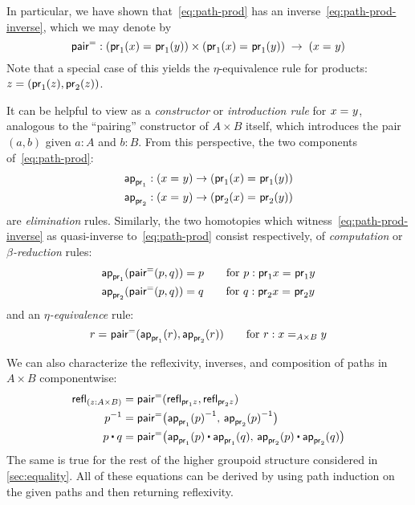 In particular, we have shown that~\eqref{eq:path-prod} has an inverse~\eqref{eq:path-prod-inverse}, which we may denote by
\[
\pairpath : (\id{\proj{1}(x)}{\proj{1}(y)}) \times (\id{\proj{1}(x)}{\proj{1}(y)}) \;\to\; {(\id x y)}
\]
Note that a special case of this yields the $\eta$-equivalence rule for products: $z = (\proj1(z),\proj2(z))$.

It can be helpful to view \pairpath as a \emph{constructor} or \emph{introduction rule} for $\id x y$, analogous to the ``pairing'' constructor of $A\times B$ itself, which introduces the pair $(a,b)$ given $a:A$ and $b:B$.
From this perspective, the two components of~\eqref{eq:path-prod}:
\begin{align*}
  \projpath{1} &: (\id{x}{y}) \to (\id{\proj{1}(x)}{\proj{1} (y)})\\
  \projpath{2} &: (\id{x}{y}) \to (\id{\proj{2}(x)}{\proj{2} (y)})
\end{align*}
are \emph{elimination} rules.
Similarly, the two homotopies which witness~\eqref{eq:path-prod-inverse} as quasi-inverse to~\eqref{eq:path-prod} consist respectively, of \emph{computation} or \emph{$\beta$-reduction} rules:
\begin{align*}
  {\projpath{1}{(\pairpath(p, q)})}
  &= %
  {p} \qquad\text{for } p:\id{\proj{1} x}{\proj{1} y} \\
  {\projpath{2}{(\pairpath(p,q)})}
  &= %
  {q} \qquad\text{for } q:\id{\proj{2} x}{\proj{2} y}
\end{align*}
and an \emph{$\eta$-equivalence} rule:
\[
\id{r}{\pairpath(\projpath{1} (r), \projpath{2} (r)) }
\qquad\text{for } r : \id[A \times B] x y
\]

We can also characterize the reflexivity, inverses, and composition of paths in $A\times B$ componentwise:
\begin{align*}
  {\refl{(z : A \times B)}}
  &= {\pairpath (\refl{\proj{1} z},\refl{\proj{2} z})} \\
  {\opp{p}}
  &= {\pairpath \big(\opp{\projpath{1} (p)},\, \opp{\projpath{2} (p)}\big)} \\
  {{p \ct q}}
  &= {\pairpath \big({\projpath{1} (p)} \ct {\projpath{1} (q)},\,{\projpath{2} (p)} \ct {\projpath{2} (q)}\big)}
\end{align*}
The same is true for the rest of the higher groupoid structure considered in \autoref{sec:equality}.
All of these equations can be derived by using path induction on the given paths and then returning reflexivity.  


